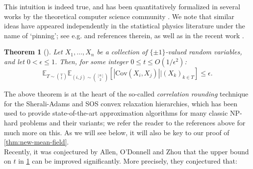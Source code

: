 \documentclass[11pt, oneside, english]{article}
\newcommand{\bE}{\mathbb{E}}
\newcommand{\Cov}{\mathrm{Cov}}
\newcommand{\E}{\bE}      %
\newtheorem{theorem}{Theorem}[section]
\theoremstyle{definition}
\theoremstyle{plain}
\begin{document}
This intuition is indeed true, and has been quantitatively formalized in several works by the theoretical computer science community \cite{barak2011rounding,guruswami2011lasserre,raghavendra-tan,yoshida-zhou}. We note that similar ideas have appeared independently in the statistical physics literature under the name of `pinning'; see e.g. \cite{ioffe2000note} and references therein, as well as in the recent work \cite{coja2017bethe}. 
\begin{theorem}[\cite{raghavendra-tan}]
\label{thm:covariance-version-corr-rounding}
Let $X_1,\dots,X_n$ be a collection of $\{\pm 1\}$-valued random variables, and let $0<\epsilon \leq 1$. Then, for some integer $0\leq t\leq O(1/\epsilon^{2})$:
$$\E_{T \sim {V \choose t}} \E_{(i,j) \sim {[n] \choose 2}} \left[\left|\Cov(X_i,X_j) \right| | (X_k)_{k\in T}\right] \leq \epsilon.$$
\end{theorem}

The above theorem is at the heart of the so-called \emph{correlation rounding} technique for the Sherali-Adams and SOS convex relaxation hierarchies, which has been used to provide state-of-the-art approximation algorithms for many classic NP-hard problems and their variants; we refer the reader to the references above for much more on this. As we will see below, it will also be key to our proof of \cref{thm:new-mean-field}.\\ 

Recently, it was conjectured by Allen, O'Donnell and Zhou \cite{allen2015conditioning} that the upper bound on $t$ in \cref{thm:covariance-version-corr-rounding} can be improved significantly. More precisely, they conjectured that:
\end{document}
